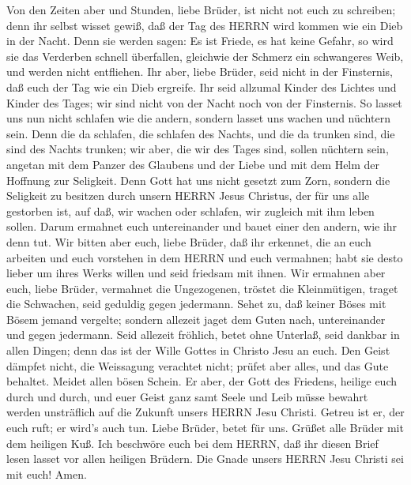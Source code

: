  Von den Zeiten aber und Stunden, liebe Brüder, ist nicht
not euch zu schreiben;  denn ihr selbst wisset gewiß, daß
der Tag des HERRN wird kommen wie ein Dieb in der Nacht. 
Denn sie werden sagen: Es ist Friede, es hat keine Gefahr, so wird sie
das Verderben schnell überfallen, gleichwie der Schmerz ein schwangeres
Weib, und werden nicht entfliehen.  Ihr aber, liebe Brüder,
seid nicht in der Finsternis, daß euch der Tag wie ein Dieb ergreife.
 Ihr seid allzumal Kinder des Lichtes und Kinder des Tages;
wir sind nicht von der Nacht noch von der Finsternis.  So
lasset uns nun nicht schlafen wie die andern, sondern lasset uns wachen
und nüchtern sein.  Denn die da schlafen, die schlafen des
Nachts, und die da trunken sind, die sind des Nachts trunken;
 wir aber, die wir des Tages sind, sollen nüchtern sein,
angetan mit dem Panzer des Glaubens und der Liebe und mit dem Helm der
Hoffnung zur Seligkeit.  Denn Gott hat uns nicht gesetzt zum
Zorn, sondern die Seligkeit zu besitzen durch unsern HERRN Jesus
Christus,  der für uns alle gestorben ist, auf daß, wir
wachen oder schlafen, wir zugleich mit ihm leben sollen. 
Darum ermahnet euch untereinander und bauet einer den andern, wie ihr
denn tut.  Wir bitten aber euch, liebe Brüder, daß ihr
erkennet, die an euch arbeiten und euch vorstehen in dem HERRN und euch
vermahnen;  habt sie desto lieber um ihres Werks willen und
seid friedsam mit ihnen.  Wir ermahnen aber euch, liebe
Brüder, vermahnet die Ungezogenen, tröstet die Kleinmütigen, traget die
Schwachen, seid geduldig gegen jedermann.  Sehet zu, daß
keiner Böses mit Bösem jemand vergelte; sondern allezeit jaget dem Guten
nach, untereinander und gegen jedermann.  Seid allezeit
fröhlich,  betet ohne Unterlaß,  seid dankbar
in allen Dingen; denn das ist der Wille Gottes in Christo Jesu an euch.
 Den Geist dämpfet nicht,  die Weissagung
verachtet nicht;  prüfet aber alles, und das Gute behaltet.
 Meidet allen bösen Schein.  Er aber, der Gott
des Friedens, heilige euch durch und durch, und euer Geist ganz samt
Seele und Leib müsse bewahrt werden unsträflich auf die Zukunft unsers
HERRN Jesu Christi.  Getreu ist er, der euch ruft; er
wird's auch tun.  Liebe Brüder, betet für uns.
 Grüßet alle Brüder mit dem heiligen Kuß.  Ich
beschwöre euch bei dem HERRN, daß ihr diesen Brief lesen lasset vor
allen heiligen Brüdern.  Die Gnade unsers HERRN Jesu
Christi sei mit euch! Amen.
